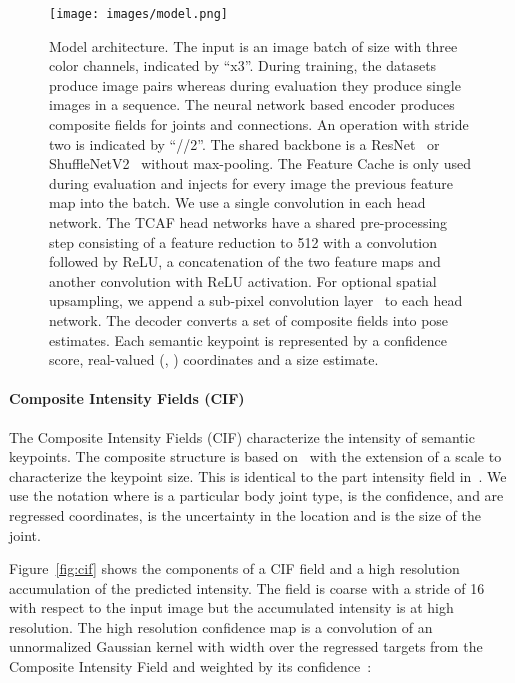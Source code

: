 \documentclass[journal]{IEEEtran}
\begin{document}
\begin{figure*}[t]
  \centering
  \texttt{[image: images/model.png]}
  \caption[Model architecture]{
    Model architecture. The input is an image batch of size  with three color
    channels, indicated by ``x3''.
    During training, the datasets produce image pairs whereas during evaluation they produce single images in a sequence.
    The neural network based encoder produces composite fields
    for  joints and  connections.
    An operation with stride two is indicated by ``//2''.
    The shared backbone is a ResNet~\cite{he2016deep}
    or ShuffleNetV2~\cite{ma2018shufflenet} without max-pooling.
    The Feature Cache is only used during evaluation and injects for every image the previous
    feature map into the batch.
    We use a single  convolution in each head network.
    The TCAF head networks have a shared pre-processing step
    consisting of a feature reduction to 512 with a 
    convolution followed by ReLU, a concatenation of the two feature maps
    and another  convolution with ReLU activation.
    For optional spatial upsampling, we append a sub-pixel convolution
    layer~\cite{shi2016real} to each head network.
    The decoder converts a set of composite fields into pose
    estimates. Each semantic keypoint is represented by a confidence score,
    real-valued (, ) coordinates and a size estimate.
  }
  \label{fig:model}
\end{figure*}


\paragraph{Composite Intensity Fields (CIF)}

The Composite Intensity Fields (CIF) characterize the intensity of semantic
keypoints. The composite structure is based on~\cite{papandreou2017towards}
with the extension of a scale  to characterize the keypoint
size. This is identical to the part intensity field in~\cite{kreiss2019pifpaf}.
We use the notation
 where  is a particular
body joint type,  is the confidence,  and  are regressed coordinates,
 is the uncertainty in the location and  is the size of the joint.

Figure~\ref{fig:cif} shows the components of a CIF field and a high resolution
accumulation of the predicted intensity. The field is coarse with a stride of
16 with respect to the input image but the accumulated intensity is at high
resolution.
The high resolution confidence map  is a convolution
of an unnormalized Gaussian kernel  with width  over
the regressed targets from
the Composite Intensity Field  and  weighted by its confidence~:
\end{document}
